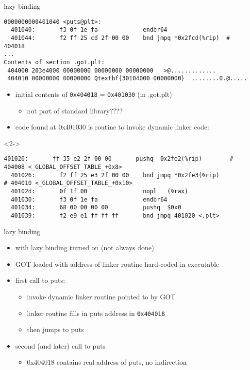 
\begin{frame}[fragile,label=dynamicPutsLazy]{lazy binding}
\begin{Verbatim}[commandchars=Q\{\},fontsize=\fontsize{8}{9}\selectfont]
0000000000401040 <puts@plt>:
  401040:       f3 0f 1e fa             endbr64 
  401044:       f2 ff 25 cd 2f 00 00    bnd jmpq *0x2fcd(%rip)  # 404018
...
Contents of section .got.plt:
 404000 203e4000 00000000 00000000 00000000   >@.............
 404010 00000000 00000000 Qtextbf{30104000 00000000}  ........0.@.....
\end{Verbatim}
\begin{itemize}
\item initial contents of {\tt 0x404018} = {\tt 0x401030} (in .got.plt)
    \begin{itemize}
    \item not part of standard library????
    \end{itemize}
\item<2-> code found at 0x401030 is routine to invoke dynamic linker code:
\end{itemize}
\begin{visibleenv}<2->
\begin{Verbatim}[commandchars=Q\{\},fontsize=\fontsize{8}{9}\selectfont]
  401020:       ff 35 e2 2f 00 00       pushq  0x2fe2(%rip)        # 404008 <_GLOBAL_OFFSET_TABLE_+0x8>
  401026:       f2 ff 25 e3 2f 00 00    bnd jmpq *0x2fe3(%rip)        # 404010 <_GLOBAL_OFFSET_TABLE_+0x10>
  40102d:       0f 1f 00                nopl   (%rax)
  401030:       f3 0f 1e fa             endbr64 
  401034:       68 00 00 00 00          pushq  $0x0
  401039:       f2 e9 e1 ff ff ff       bnd jmpq 401020 <.plt>
\end{Verbatim}
\end{visibleenv}
\end{frame}

\begin{frame}{lazy binding}
\begin{itemize}
\item with lazy binding turned on (not always done)
\vspace{.5cm}
\item GOT loaded with address of linker routine hard-coded in executable
\item first call to puts:
    \begin{itemize}
    \item invoke dynamic linker routine pointed to by GOT
    \item linker routine fills in puts address in {\tt 0x404018}
    \item then jumps to puts
    \end{itemize}
\item second (and later) call to puts
    \begin{itemize}
    \item 0x404018 contains real address of puts, no indirection
    \end{itemize}
\end{itemize}
\end{frame}

